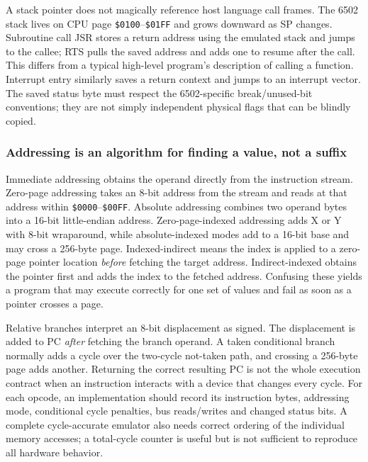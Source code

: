 A stack pointer does not magically reference host language call frames. The 6502 stack lives on CPU page \texttt{\$0100}--\texttt{\$01FF} and grows downward as SP changes. Subroutine call JSR stores a return address using the emulated stack and jumps to the callee; RTS pulls the saved address and adds one to resume after the call. This differs from a typical high-level program's description of calling a function. Interrupt entry similarly saves a return context and jumps to an interrupt vector. The saved status byte must respect the 6502-specific break/unused-bit conventions; they are not simply independent physical flags that can be blindly copied.

\subsubsection{Addressing is an algorithm for finding a value, not a suffix}\label{addressing-is-an-algorithm-for-finding-a-value-not-a-suffix}

Immediate addressing obtains the operand directly from the instruction stream. Zero-page addressing takes an 8-bit address from the stream and reads at that address within \texttt{\$0000}--\texttt{\$00FF}. Absolute addressing combines two operand bytes into a 16-bit little-endian address. Zero-page-indexed addressing adds X or Y with 8-bit wraparound, while absolute-indexed modes add to a 16-bit base and may cross a 256-byte page. Indexed-indirect means the index is applied to a zero-page pointer location \emph{before} fetching the target address. Indirect-indexed obtains the pointer first and adds the index to the fetched address. Confusing these yields a program that may execute correctly for one set of values and fail as soon as a pointer crosses a page.

Relative branches interpret an 8-bit displacement as signed. The displacement is added to PC \emph{after} fetching the branch operand. A taken conditional branch normally adds a cycle over the two-cycle not-taken path, and crossing a 256-byte page adds another. Returning the correct resulting PC is not the whole execution contract when an instruction interacts with a device that changes every cycle. For each opcode, an implementation should record its instruction bytes, addressing mode, conditional cycle penalties, bus reads/writes and changed status bits. A complete cycle-accurate emulator also needs correct ordering of the individual memory accesses; a total-cycle counter is useful but is not sufficient to reproduce all hardware behavior.

